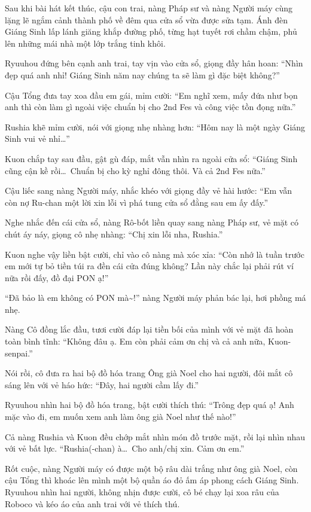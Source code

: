 \documentclass[../main.tex]{subfiles}
\begin{document}
Sau khi bài hát kết thúc, cậu con trai, nàng Pháp sư và nàng Người máy cùng lặng lẽ ngắm cảnh thành phố về đêm qua cửa sổ vừa được sửa tạm. Ánh đèn Giáng Sinh lấp lánh giăng khắp đường phố, từng hạt tuyết rơi chầm chậm, phủ lên những mái nhà một lớp trắng tinh khôi.

Ryuuhou đứng bên cạnh anh trai, tay vịn vào cửa sổ, giọng đầy hân hoan: ``Nhìn đẹp quá anh nhỉ! Giáng Sinh năm nay chúng ta sẽ làm gì đặc biệt không?''

Cậu Tổng đưa tay xoa đầu em gái, mỉm cười: ``Em nghĩ xem, mấy đứa như bọn anh thì còn làm gì ngoài việc chuẩn bị cho 2nd Fes và công việc tồn đọng nữa.''

Rushia khẽ mỉm cười, nói với giọng nhẹ nhàng hơn: ``Hôm nay là một ngày Giáng Sinh vui vẻ nhỉ\dots''

Kuon chắp tay sau đầu, gật gù đáp, mắt vẫn nhìn ra ngoài cửa sổ: ``Giáng Sinh cũng cận kề rồi\dots\ Chuẩn bị cho kỳ nghỉ đông thôi. Và cả 2nd Fes nữa.''

Cậu liếc sang nàng Người máy, nhắc khéo với giọng đầy vẻ hài hước: ``Em vẫn còn nợ Ru-chan một lời xin lỗi vì phá tung cửa sổ đằng sau em ấy đấy.''

Nghe nhắc đến cái cửa sổ, nàng Rô-bốt liền quay sang nàng Pháp sư, vẻ mặt có chút áy náy, giọng cô nhẹ nhàng: ``Chị xin lỗi nha, Rushia.''

Kuon nghe vậy liền bật cười, chỉ vào cô nàng mà xóc xỉa: ``Còn nhớ là tuần trước em mới tự bỏ tiền túi ra đền cái cửa đúng không? Lần này chắc lại phải rút ví nữa rồi đấy, đồ đại PON ạ!''

``Đã bảo là em không có PON mà\~{}!'' nàng Người máy phản bác lại, hơi phồng má nhẹ.

Nàng Cô đồng lắc đầu, tươi cười đáp lại tiền bối của mình với vẻ mặt đã hoàn toàn bình tĩnh: ``Không đâu ạ. Em còn phải cảm ơn chị và cả anh nữa, Kuon-senpai.''

Nói rồi, cô đưa ra hai bộ đồ hóa trang Ông già Noel cho hai người, đôi mắt cô sáng lên với vẻ háo hức: ``Đây, hai người cầm lấy đi.''

Ryuuhou nhìn hai bộ đồ hóa trang, bật cười thích thú: ``Trông đẹp quá ạ! Anh mặc vào đi, em muốn xem anh làm ông già Noel như thế nào!''

Cả nàng Rushia và Kuon đều chớp mắt nhìn món đồ trước mặt, rồi lại nhìn nhau với vẻ bất lực. ``Rushia(-chan) à\dots\ Cho anh/chị xin. Cảm ơn em.''

Rốt cuộc, nàng Người máy có được một bộ râu dài trắng như ông già Noel, còn cậu Tổng thì khoác lên mình một bộ quần áo đỏ ấm áp phong cách Giáng Sinh. Ryuuhou nhìn hai người, không nhịn được cười, cô bé chạy lại xoa râu của Roboco và kéo áo của anh trai với vẻ thích thú.
\end{document}
